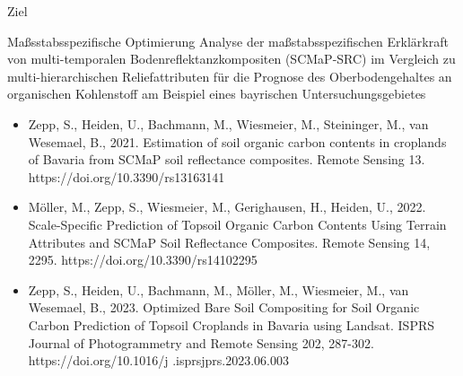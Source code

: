 \begin{frame}{Ziel}
\begin{alertblock}{Maßsstabsspezifische Optimierung}
Analyse der maßstabsspezifischen Erklärkraft von  multi-temporalen Bodenreflektanzkompositen (SCMaP-SRC) im Vergleich zu multi-hierarchischen Reliefattributen für die Prognose des Oberbodengehaltes an organischen Kohlenstoff am Beispiel eines bayrischen Untersuchungsgebietes
\end{alertblock}

\vspace{5pt}
\raggedright\tiny
\begin{itemize}
\item Zepp, S., Heiden, U., Bachmann, M., Wiesmeier, M., Steininger, M., van Wesemael, B., 2021. Estimation of soil organic carbon contents in croplands of Bavaria from SCMaP soil reflectance composites. Remote Sensing 13. https://doi.org/10.3390/rs13163141  
\item \alert{Möller, M., Zepp, S., Wiesmeier, M., Gerighausen, H., Heiden, U., 2022. Scale-Specific Prediction of Topsoil Organic Carbon Contents Using Terrain Attributes and SCMaP Soil Reflectance Composites. Remote Sensing 14, 2295. https://doi.org/10.3390/rs14102295  }
\item Zepp, S., Heiden, U., Bachmann, M., Möller, M., Wiesmeier, M., van Wesemael, B., 2023. Optimized Bare Soil Compositing for Soil Organic Carbon Prediction of Topsoil Croplands in Bavaria using Landsat. ISPRS Journal of Photogrammetry and Remote Sensing 202, 287-302. https://doi.org/10.1016/j     .isprsjprs.2023.06.003   
\end{itemize} 
\end{frame}



